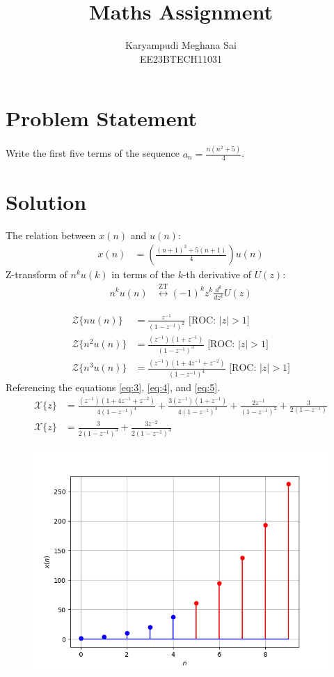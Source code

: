 \documentclass{article}
\newcommand{\system}[1]{\mathcal{Z}\{#1\}}
\begin{document}
\title{Maths Assignment}
\author{Karyampudi Meghana Sai\\ EE23BTECH11031}
\maketitle

\section*{Problem Statement}
Write the first five terms of the sequence \(a_n = \frac{n(n^2+5)}{4}\).

\section*{Solution}
The relation between \(x(n)\) and \(u(n)\):
\begin{align}
 x(n) &= \left(\frac{(n+1)^3+5(n+1)}{4}\right) u(n)\label{eq:1}
\end{align}
Z-transform of \(n^ku(k)\) in terms of the \(k\)-th derivative of \(U(z)\):
\begin{align}
n^k u(n) &\overset{\text{ZT}}{\longleftrightarrow} (-1)^k z^k \frac{d^k}{dz^k}U(z)
\end{align}

\begin{align}
    \system{nu(n)} &= \frac{z^{-1}}{(1 - z^{-1})^2} \label{eq:3} \text{ [ROC: } \lvert z \rvert > 1\text{]} \\
    \system{n^2u(n)} &= \frac{(z^{-1})(1+z^{-1})}{(1 - z^{-1})^3} \label{eq:4} \text{ [ROC: } \lvert z \rvert > 1\text{]} \\
    \system{n^3u(n)} &= \frac{(z^{-1})(1+4z^{-1}+z^{-2})}{(1 - z^{-1})^4} \label{eq:5} \text{ [ROC: } \lvert z \rvert > 1\text{]}
\end{align}
Referencing the equations \eqref{eq:3}, \eqref{eq:4}, and \eqref{eq:5}.
\begin{align}
\mathcal{X}\{z\} &= \frac{(z^{-1})(1+4z^{-1}+z^{-2})}{4(1-z^{-1})^4} + \frac{3(z^{-1})(1+z^{-1})}{4(1-z^{-1})^3} + \frac{2z^{-1}}{(1 - z^{-1})^2} + \frac{3}{2(1- z^{-1})} \\
\mathcal{X}\{z\} &= \frac{3}{2(1-z^{-1})^3}+\frac{3z^{-2}}{2(1-z^{-1})^4}
\end{align}

\newpage
\begin{figure}
    \centering
    \includegraphics{figs/plot.png}
    \label{fig:your_label}
\end{figure}
\end{document}
